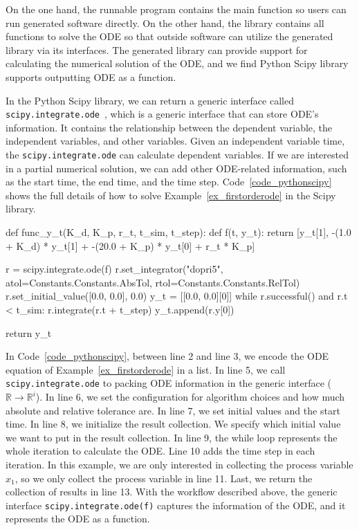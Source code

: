 On the one hand, the runnable program contains the main function so users can run generated software directly. On the other hand, the library contains all functions to solve the ODE so that outside software can utilize the generated library via its interfaces. The generated library can provide support for calculating the numerical solution of the ODE, and we find Python Scipy library supports outputting ODE as a function.

In the Python Scipy library, we can return a generic interface called \verb|scipy.integrate.ode|~\citep{scipyfun}, which is a generic interface that can store ODE's information. It contains the relationship between the dependent variable, the independent variables, and other variables. Given an independent variable time, the \verb|scipy.integrate.ode| can calculate dependent variables. If we are interested in a partial numerical solution, we can add other ODE-related information, such as the start time, the end time, and the time step. Code~\ref{code_pythonscipy} shows the full details of how to solve Example~\ref{ex_firstorderode} in the Scipy library.

\begin{listing}[ht]
\begin{python1}
def func_y_t(K_d, K_p, r_t, t_sim, t_step):
    def f(t, y_t):
        return [y_t[1], -(1.0 + K_d) * y_t[1] + -(20.0 + K_p) * y_t[0] + r_t * K_p]
    
    r = scipy.integrate.ode(f)
    r.set_integrator("dopri5", atol=Constants.Constants.AbsTol, rtol=Constants.Constants.RelTol)
    r.set_initial_value([0.0, 0.0], 0.0)
    y_t = [[0.0, 0.0][0]]
    while r.successful() and r.t < t_sim:
        r.integrate(r.t + t_step)
        y_t.append(r.y[0])
    
    return y_t
\end{python1}
\label{code_pythonscipy}
\end{listing}

In Code~\ref{code_pythonscipy}, between line 2 and line 3, we encode the ODE equation of Example~\ref{ex_firstorderode} in a list. In line 5, we call \verb|scipy.integrate.ode| to packing ODE information in the generic interface ($\mathbb{R} \rightarrow \mathbb{R}^i$). In line 6, we set the configuration for algorithm choices and how much absolute and relative tolerance are. In line 7, we set initial values and the start time. In line 8, we initialize the result collection. We specify which initial value we want to put in the result collection. In line 9, the while loop represents the whole iteration to calculate the ODE.  Line 10 adds the time step in each iteration. In this example, we are only interested in collecting the process variable $x_1$, so we only collect the process variable in line 11. Last, we return the collection of results in line 13. With the workflow described above, the generic interface \verb|scipy.integrate.ode(f)| captures the information of the ODE, and it represents the ODE as a function.


